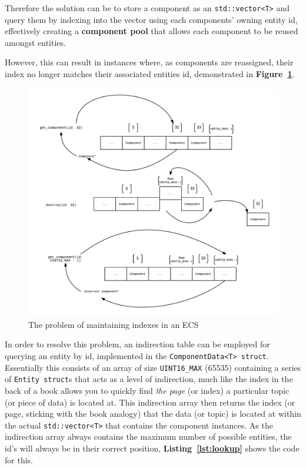 \documentclass[10pt]{scrartcl}
\begin{document}
	Therefore the solution can be to store a component as an \texttt{std::vector<T>} and query them by indexing into the vector using each components' owning entity id, effectively creating a \textbf{component pool} that allows each component to be reused amongst entities.

	However, this can result in instances where, as components are reassigned, their index no longer matches their associated entities id, demonstrated in \textbf{Figure~\ref{fig:swapnpop_prob}}.

	\begin{figure}[H]
		\centering
		\includegraphics[width=\textwidth]{models/swapnpop.png}
		\caption{The problem of maintaining indexes in an ECS}
		\label{fig:swapnpop_prob}
	\end{figure}

	\par
	In order to resolve this problem, an indirection table can be employed for querying an entity by id, implemented in the \texttt{ComponentData<T> struct}. Essentially this consists of an array of size \texttt{UINT16_MAX} (65535) containing a series of \texttt{Entity struct}s that acts as a level of indirection, much like the index in the back of a book allows you to quickly find \textit{the page} (or index) a particular topic (or piece of data) is located at. This indirection array then returns the index (or page, sticking with the book analogy) that the data (or topic) is located at within the actual \texttt{std::vector<T>} that contains the component instances. As the indirection array always contains the maximum number of possible entities, the id's will always be in their correct position, \textbf{Listing~\ref{lst:lookup}} shows the code for this.
\end{document}
